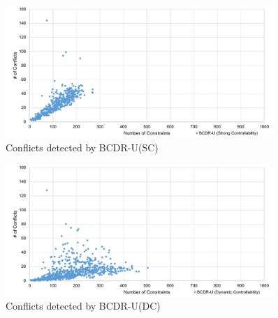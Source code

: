 \documentclass[jair,twoside,11pt,theapa]{article}
\begin{document}
\begin{figure}[!ht]
	\centering
	\includegraphics[width=0.9\textwidth]{figures/results/bcdr_sc_conflicts.pdf}
	\caption{Conflicts detected by BCDR-U(SC)}
	\label{fig:bcdr_sc_conflicts_results}
\end{figure}

\begin{figure}[!ht]
	\centering
	\includegraphics[width=0.9\textwidth]{figures/results/bcdr_dc_conflicts.pdf}
	\caption{Conflicts detected by BCDR-U(DC)}
	\label{fig:bcdr_dc_conflicts_results}
\end{figure}
\end{document}
